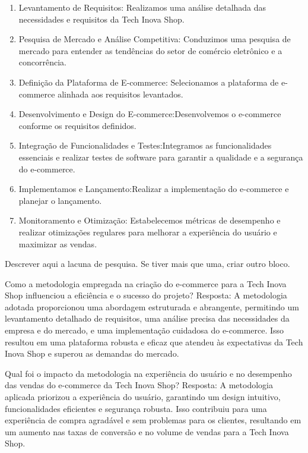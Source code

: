 		\begin{enumerate}
			\item Levantamento de Requisitos: Realizamos uma análise detalhada das necessidades e requisitos da Tech Inova Shop.
			\item Pesquisa de Mercado e Análise Competitiva:
Conduzimos uma pesquisa de mercado para entender as tendências do setor de comércio eletrônico e a concorrência.
            \item Definição da Plataforma de E-commerce:
Selecionamos a plataforma de e-commerce alinhada aos requisitos levantados.
             \item Desenvolvimento e Design do E-commerce:Desenvolvemos o e-commerce conforme os requisitos definidos.
             \item Integração de Funcionalidades e Testes:Integramos as funcionalidades essenciais e realizar testes de software para garantir a qualidade e a segurança do e-commerce.
             \item Implementamos e Lançamento:Realizar a implementação do e-commerce e planejar o lançamento.
             \item Monitoramento e Otimização:
Estabelecemos métricas de desempenho e realizar otimizações regulares para melhorar a experiência do usuário e maximizar as vendas.

		\end{enumerate}

		\begin{lacuna}
		\label{lacuna:lacuna1}
			Descrever aqui a lacuna de pesquisa. Se tiver mais que uma, criar outro bloco.
		\end{lacuna}
	
		\begin{pergunta}
		\label{pergunta:pergunta_1}
			Como a metodologia empregada na criação do e-commerce para a Tech Inova Shop influenciou a eficiência e o sucesso do projeto?
Resposta: A metodologia adotada proporcionou uma abordagem estruturada e abrangente, permitindo um levantamento detalhado de requisitos, uma análise precisa das necessidades da empresa e do mercado, e uma implementação cuidadosa do e-commerce. Isso resultou em uma plataforma robusta e eficaz que atendeu às expectativas da Tech Inova Shop e superou as demandas do mercado.
		\end{pergunta}

		\begin{pergunta}
		\label{pergunta:pergunta_2}
			Qual foi o impacto da metodologia na experiência do usuário e no desempenho das vendas do e-commerce da Tech Inova Shop?
Resposta: A metodologia aplicada priorizou a experiência do usuário, garantindo um design intuitivo, funcionalidades eficientes e segurança robusta. Isso contribuiu para uma experiência de compra agradável e sem problemas para os clientes, resultando em um aumento nas taxas de conversão e no volume de vendas para a Tech Inova Shop.
		\end{pergunta}	
